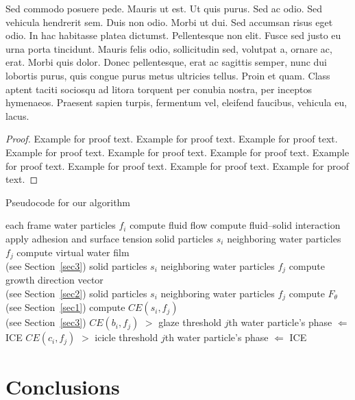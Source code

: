 \documentclass[AMA,Times1COL]{WileyNJDv5} %
\begin{document}
Sed commodo posuere pede. Mauris ut est. Ut quis purus. Sed ac odio. Sed vehicula hendrerit sem. Duis non
odio. Morbi ut dui. Sed accumsan risus eget odio. In hac habitasse platea dictumst. Pellentesque non elit. Fusce
sed justo eu urna porta tincidunt. Mauris felis odio, sollicitudin sed, volutpat a, ornare ac, erat. Morbi quis dolor.
Donec pellentesque, erat ac sagittis semper, nunc dui lobortis purus, quis congue purus metus ultricies tellus. Proin
et quam. Class aptent taciti sociosqu ad litora torquent per conubia nostra, per inceptos hymenaeos. Praesent sapien
turpis, fermentum vel, eleifend faucibus, vehicula eu, lacus.


\begin{proof}
Example for proof text. Example for proof text. Example for proof text. Example for proof text. Example for proof text. Example for proof text. Example for proof text. Example for proof text. Example for proof text. Example for proof text.
\end{proof}

\begin{algorithm}
\caption{\enskip Pseudocode for our algorithm}\label{alg1}
\begin{algorithmic}
  \For each frame
  \For water particles $f_{i}$
  \State compute fluid flow \cite{Hirt1974}
  \State compute fluid--solid interaction \cite{Benson1992}
  \State apply adhesion and surface tension \cite{Margolin2003}
  \EndFor
   \For solid particles $s_{i}$
   \For neighboring water particles $f_{j}$
   \State compute virtual water film \\(see Section~\ref{sec3})
   \EndFor
   \EndFor
   \For solid particles $s_{i}$
   \For neighboring water particles $f_{j}$
   \State compute growth direction vector \\(see Section~\ref{sec2})
   \EndFor
   \EndFor
   \For solid particles $s_{i}$
   \For neighboring water particles $f_{j}$
   \State compute $F_{\theta}$ (see Section~\ref{sec1})
   \State compute $CE(s_{i},f_{j})$ \\(see Section~\ref{sec3})
   \If $CE(b_{i}, f_{j})$ $>$ glaze threshold
   \State $j$th water particle's phase $\Leftarrow$ ICE
   \EndIf
   \If $CE(c_{i}, f_{j})$ $>$ icicle threshold
   \State $j$th water particle's phase $\Leftarrow$ ICE
   \EndIf
   \EndFor
   \EndFor
  \EndFor
\end{algorithmic}
\end{algorithm}



\section{Conclusions}\label{sec5}
\end{document}
